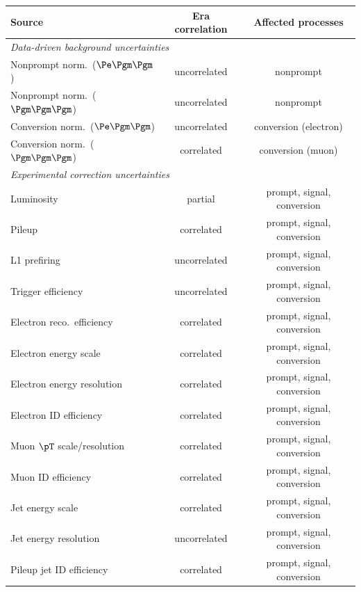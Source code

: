 \begin{table}[htbp]
  \centering
  \begin{tabular}{lcc}
    \hline
    Source & Era correlation & Affected processes \\
    \hline
    \multicolumn{3}{l}{\textit{Data-driven background uncertainties}} \\
    Nonprompt norm.\ ($\Pe\Pgm\Pgm$)     & uncorrelated     & nonprompt \\
    Nonprompt norm.\ ($\Pgm\Pgm\Pgm$)    & uncorrelated     & nonprompt \\
    Conversion norm.\ ($\Pe\Pgm\Pgm$)     & uncorrelated     & conversion (electron) \\
    Conversion norm.\ ($\Pgm\Pgm\Pgm$)    & correlated       & conversion (muon) \\
    \hline
    \multicolumn{3}{l}{\textit{Experimental correction uncertainties}} \\
    Luminosity                             & partial          & prompt, signal, conversion \\
    Pileup                                 & correlated       & prompt, signal, conversion \\
    L1 prefiring                           & uncorrelated     & prompt, signal, conversion \\
    Trigger efficiency                     & uncorrelated     & prompt, signal, conversion \\
    Electron reco.\ efficiency             & correlated       & prompt, signal, conversion \\
    Electron energy scale                  & correlated       & prompt, signal, conversion \\
    Electron energy resolution             & correlated       & prompt, signal, conversion \\
    Electron ID efficiency                 & correlated       & prompt, signal, conversion \\
    Muon $\pT$ scale/resolution            & correlated       & prompt, signal, conversion \\
    Muon ID efficiency                     & correlated       & prompt, signal, conversion \\
    Jet energy scale                       & correlated       & prompt, signal, conversion \\
    Jet energy resolution                  & uncorrelated     & prompt, signal, conversion \\
    Pileup jet ID efficiency               & correlated       & prompt, signal, conversion \\

\end{tabular}
\end{table}

